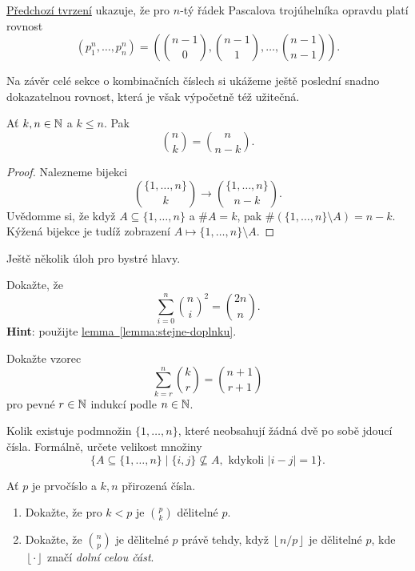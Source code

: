 \hyperref[claim:pascalova-rovnost]{Předchozí tvrzení} ukazuje, že pro $n$-tý
řádek Pascalova trojúhelníka oprav\-du platí rovnost
\[
 (p_1^{n},\ldots,p_n^{n}) = \left(
 \binom{n-1}{0},\binom{n-1}{1},\ldots,\binom{n-1}{n-1} \right).
\]

Na závěr celé sekce o kombinačních číslech si ukážeme ještě poslední snadno
dokazatelnou rovnost, která je však výpočetně též užitečná.

\begin{lemma}
 \label{lemma:stejne-doplnku}
 Ať $k,n \in \mathbb{N}$ a $k \leq n$. Pak
 \[
  \binom{n}{k} = \binom{n}{n-k}.
 \]
\end{lemma}
\begin{proof}
 Nalezneme bijekci
 \[
  \binom{\{1,\ldots,n\}}{k} \to \binom{\{1,\ldots,n\}}{n-k}.
 \]
 Uvědomme si, že když $A \subseteq \{1,\ldots,n\}$ a $\# A = k$, pak $\#
 (\{1,\ldots,n\} \setminus A) = n - k$. Kýžená bijekce je tudíž zobrazení $A
 \mapsto \{1,\ldots,n\} \setminus A$.
\end{proof}

Ještě několik úloh pro bystré hlavy.

\begin{exercise}
 Dokažte, že
 \[
  \sum_{i=0}^{n} \binom{n}{i}^2 = \binom{2n}{n}.
 \]
 \textbf{Hint}: použijte
 \hyperref[lemma:stejne-doplnku]{lemma~\ref*{lemma:stejne-doplnku}}.
\end{exercise}

\begin{exercise}
 Dokažte vzorec
 \[
  \sum_{k=r}^{n} \binom{k}{r} = \binom{n+1}{r+1}
 \]
 pro pevné $r \in \mathbb{N}$ indukcí podle $n \in \mathbb{N}$.
\end{exercise}

\begin{exercise}[těžké]
 Kolik existuje podmnožin $\{1,\ldots,n\}$, které neobsahují žádná dvě po sobě
 jdoucí čísla. Formálně, určete velikost množiny
 \[
  \{A \subseteq \{1,\ldots,n\} \mid \{i,j\} \nsubseteq A, \text{ kdykoli }
  |i-j|=1\}.
 \]
\end{exercise}

\begin{exercise}
 Ať $p$ je prvočíslo a $k,n$ přirozená čísla.
 \begin{enumerate}[label=(\alph*),topsep=0pt]
  \item Dokažte, že pro $k<p$ je $\binom{p}{k}$ dělitelné $p$.
  \item Dokažte, že $\binom{n}{p}$ je dělitelné $p$ právě tehdy, když $\left\lfloor n
   / p \right\rfloor$ je dělitelné $p$, kde $\left\lfloor  \cdot \right\rfloor$ 
   značí \emph{dolní celou část}.
 \end{enumerate}
\end{exercise}

